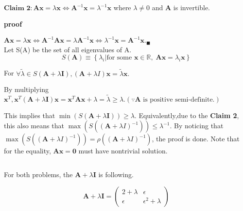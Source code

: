 \documentclass[12pt]{article}
\begin{document}
\noindent$\textbf{Claim 2} : \boldsymbol{A}\boldsymbol{x} = \lambda \boldsymbol{x} \iff \boldsymbol{A}^{-1}\boldsymbol{x} = \lambda^{-1} \boldsymbol{x}$ where $\lambda \ne 0$ and $\boldsymbol{A}$ is invertible. 

\noindent\textbf{proof}

$\boldsymbol{A}\boldsymbol{x} = \lambda \boldsymbol{x} \iff \boldsymbol{A}^{-1}\boldsymbol{A}\boldsymbol{x} = \lambda \boldsymbol{A}^{-1}\boldsymbol{x} \iff \lambda^{-1} \boldsymbol{x} = \boldsymbol{A}^{-1} \boldsymbol{x}._\blacksquare$
\\

\noindent
Let S(A) be the set of all eigenvalues of A.
\begin{equation}
    S(\boldsymbol{A}) \equiv \left\{\lambda_i | \text{for some } \boldsymbol{x} \in \mathbb{R},\; \boldsymbol{A}\boldsymbol{x} = \lambda_i \boldsymbol{x} \right\}
\end{equation}

\noindent
For $\forall \tilde{\lambda} \in S(\boldsymbol{A}+\lambda \boldsymbol{I}), (\boldsymbol{A}+\lambda I)\boldsymbol{x} = \tilde{\lambda}\boldsymbol{x}.$ 

\noindent
By multiplying $\boldsymbol{x}^T, \boldsymbol{x}^T (\boldsymbol{A} + \lambda \boldsymbol{I}) \boldsymbol{x} =  \boldsymbol{x}^T \boldsymbol{A} \boldsymbol{x} + \lambda = \tilde{\lambda} \ge \lambda.(\because \boldsymbol{A} \text{ is positive semi-definite.})$

\noindent
This implies that $\min(S(\boldsymbol{A}+\lambda \boldsymbol{I})) \ge \lambda$. Equivalently,due to the \textbf{Claim 2}, this also means that $\max(S((\boldsymbol{A} + \lambda I)^{-1})) \le \lambda^{-1}$. By noticing that $\max(S((\boldsymbol{A} + \lambda I)^{-1})) = \rho((\boldsymbol{A} + \lambda I)^{-1})$, the proof is done. Note that for the equality, $\boldsymbol{A}\boldsymbol{x} = \textbf{0}$ must have nontrivial solution. 

\subsection{}
For both problems, the $\boldsymbol{A} + \lambda \boldsymbol{I}$ is following. 

\begin{equation}
    \boldsymbol{A} + \lambda \boldsymbol{I} = \begin{pmatrix}
        2 + \lambda & \epsilon \\ \epsilon & \epsilon^2 + \lambda
    \end{pmatrix}
    \label{eqn:A}
\end{equation}
\end{document}
